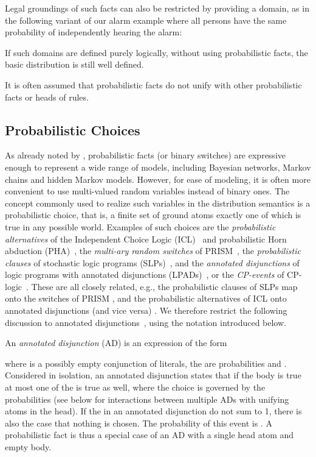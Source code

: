 \documentclass[a4paper]{article}
\begin{document}
Legal groundings of such facts can also be restricted by providing a
domain, as in the following variant of our alarm
example where all persons have the same probability of independently hearing
the alarm:

If such domains are defined purely logically, without using
probabilistic facts, the basic distribution is still
well defined. 


It is often assumed that probabilistic facts do not unify with other
probabilistic facts or heads of rules. 

\subsection{Probabilistic Choices}
\label{sec:ads}
As already noted by \cite{Sato:95}, probabilistic facts (or binary
switches) are expressive enough to represent a wide range of models,
including Bayesian networks, Markov chains and hidden Markov
models. However, for ease of modeling, it is often more convenient to
use multi-valued random variables instead of binary ones. The concept
commonly used to realize such variables in the distribution semantics
is a  probabilistic choice, that is, a finite 
set of ground atoms exactly one of which is true in any possible
world. 
Examples of such choices are the \emph{probabilistic alternatives} of the
Independent Choice Logic (ICL)~\citep{Poole00} and probabilistic Horn
abduction (PHA)~\citep{Poole:93}, the \emph{multi-ary random switches}
of PRISM~\citep{SatoKameya:01}, the \emph{probabilistic clauses} of
stochastic logic programs (SLPs)~\citep{Muggleton:96}, and the
\emph{annotated disjunctions} of logic programs with annotated
disjunctions (LPADs)~\citep{Vennekens04}, or the \emph{CP-events}
of CP-logic~\citep{Vennekens07}. These are all closely related, e.g.,
the probabilistic clauses of SLPs map onto the switches of PRISM
\citep{cussens:pr05}, and the probabilistic alternatives of ICL onto
annotated disjunctions (and vice versa) \citep{Vennekens04}. We
therefore  restrict the following discussion
to annotated disjunctions~\citep{Vennekens04}, using the notation
introduced below.

An \emph{annotated disjunction} (AD) is an expression of the form 

where  is a possibly empty
conjunction of literals, the  are probabilities and . Considered in isolation, an annotated disjunction states that if the body  is true at most one of the  is true as
well, where
the choice is governed by the probabilities (see below for
interactions between multiple ADs with unifying atoms in the head). If the  in an annotated disjunction
do not sum to 1, there is also the case that nothing is chosen. The
probability of this event is . A probabilistic
fact is thus a special case of an AD with a single head atom and empty
body. 
\end{document}
